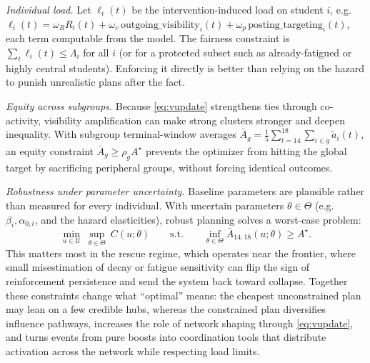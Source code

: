 \documentclass[11pt]{article}
\begin{document}
\emph{Individual load.} Let $\ell_i(t)$ be the intervention-induced load on student $i$, e.g.\ $\ell_i(t)=\omega_R R_i(t)+\omega_v\,\mathrm{outgoing\_visibility}_i(t)+\omega_p\,\mathrm{posting\_targeting}_i(t)$, each term computable from the model. The fairness constraint is $\sum_t \ell_i(t)\le\Lambda_i$ for all $i$ (or for a protected subset such as already-fatigued or highly central students). Enforcing it directly is better than relying on the hazard to punish unrealistic plans after the fact.

\emph{Equity across subgroups.} Because \eqref{eq:vupdate} strengthens ties through co-activity, visibility amplification can make strong clusters stronger and deepen inequality. With subgroup terminal-window averages $\bar A_g=\tfrac15\sum_{t=14}^{18}\sum_{i\in g}\tilde a_i(t)$, an equity constraint $\bar A_g\ge\rho_g A^\star$ prevents the optimizer from hitting the global target by sacrificing peripheral groups, without forcing identical outcomes.

\emph{Robustness under parameter uncertainty.} Baseline parameters are plausible rather than measured for every individual. With uncertain parameters $\theta\in\Theta$ (e.g.\ $\beta_i,\alpha_{0,i}$, and the hazard elasticities), robust planning solves a worst-case problem:
\begin{equation*}
\min_{u\in\mathcal U}\ \sup_{\theta\in\Theta}\ C(u;\theta)
\qquad\text{s.t.}\qquad \inf_{\theta\in\Theta}\bar A_{14:18}(u;\theta)\ge A^\star.
\end{equation*}
This matters most in the rescue regime, which operates near the frontier, where small misestimation of decay or fatigue sensitivity can flip the sign of reinforcement persistence and send the system back toward collapse. Together these constraints change what ``optimal'' means: the cheapest unconstrained plan may lean on a few credible hubs, whereas the constrained plan diversifies influence pathways, increases the role of network shaping through \eqref{eq:vupdate}, and turns events from pure boosts into coordination tools that distribute activation across the network while respecting load limits.
\end{document}
